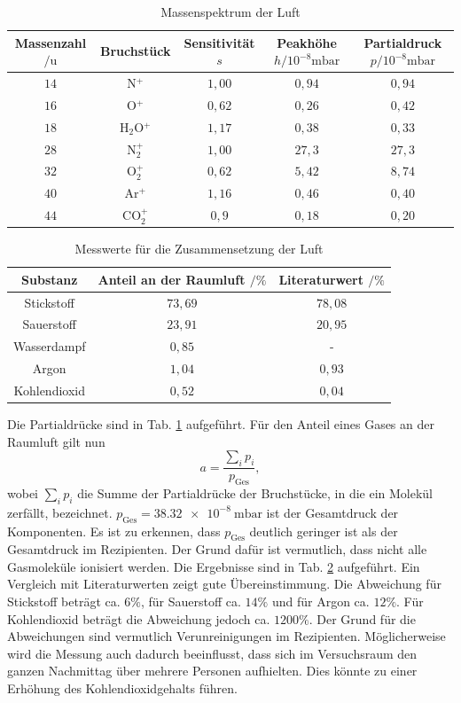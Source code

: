 \begin{table}[tb]
 \caption{Massenspektrum der Luft}
 \label{tab:41}
 \hskip-1.0cm
 \begin{tabular}{ccccc} \toprule
   Massenzahl $/\si{\amu}$ & Bruchstück & Sensitivität $s$ & Peakhöhe $h/10^{-8}\si{\milli \bar}$ & Partialdruck $p/10^{-8}\si{\milli \bar}$ \\ \midrule
   $14$ & N$^{+}$ & $1,00$ & $0,94$ & $0,94$\\
   $16$ & O$^{+}$ & $0,62$ & $0,26$ & $0,42$ \\
   $18$ & H$_{2}$O$^{+}$ & $1,17$ & $0,38$ & $0,33$ \\
   $28$ & N$_{2}^{+}$ & $1,00$ & $27,3$ & $27,3$ \\
   $32$ & O$_{2}^{+}$ & $0,62$ & $5,42$ & $8,74$ \\
   $40$ & Ar$^{+}$ & $1,16$ & $0,46$ & $0,40$ \\
   $44$ & CO$_{2}^{+}$ & $0,9$ & $0,18$ & $0,20$ \\ \bottomrule
 \end{tabular}
\end{table}


\begin{table}[tb]
 \centering
 \caption{Messwerte für die Zusammensetzung der Luft}
 \label{tab:42}
 \begin{tabular}{ccc} \toprule
   Substanz & Anteil an der Raumluft $/\%$ & Literaturwert \cite{lubw} $/\%$ \\ \midrule
   Stickstoff & $73,69$ & $78,08$ \\
   Sauerstoff & $23,91$ & $20,95$ \\
   Wasserdampf & $0,85$ & - \\
   Argon & $1,04$ & $0,93$ \\
   Kohlendioxid & $0,52$ & $0,04$ \\ \bottomrule
 \end{tabular}

\end{table}


Die Partialdrücke sind in Tab. \ref{tab:41} aufgeführt. Für den Anteil eines Gases an der Raumluft gilt nun
\begin{equation}
 a = \frac{\sum_{i}p_{i}}{p_{\textrm{Ges}}},
\end{equation}
wobei $\sum_{i}p_{i}$ die Summe der Partialdrücke der Bruchstücke, in die ein Molekül zerfällt, bezeichnet. $p_{\textrm{Ges}}=\SI{38,32e-8}{\milli\bar}$ ist der Gesamtdruck der Komponenten. Es ist zu erkennen, dass $p_{\textrm{Ges}}$ deutlich geringer ist als der Gesamtdruck im Rezipienten.
Der Grund dafür ist vermutlich, dass nicht alle Gasmoleküle ionisiert werden.
Die Ergebnisse sind in Tab. \ref{tab:42} aufgeführt. Ein Vergleich mit Literaturwerten \cite{lubw} zeigt gute Übereinstimmung. Die Abweichung für Stickstoff beträgt ca. $6\%$, für Sauerstoff ca. $14\%$ und für Argon ca. $12\%$. Für Kohlendioxid beträgt die Abweichung jedoch ca. $1200\%$. Der Grund für die Abweichungen sind vermutlich Verunreinigungen im Rezipienten.
Möglicherweise wird die Messung auch dadurch beeinflusst, dass sich im Versuchsraum den ganzen Nachmittag über mehrere Personen aufhielten. Dies könnte zu einer Erhöhung des Kohlendioxidgehalts führen.

